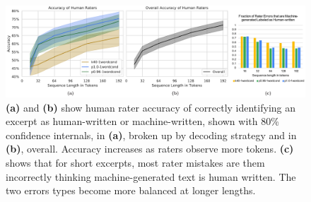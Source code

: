 \begin{figure}[t]
    \centering
    \includegraphics[width=\textwidth]{figures/human_merged}
    \caption{\textbf{(a)} and \textbf{(b)} show human rater accuracy of correctly identifying an excerpt as human-written or machine-written, shown with 80\% confidence internals, in \textbf{(a)}, broken up by decoding strategy and in \textbf{(b)}, overall. Accuracy increases as raters observe more tokens. \textbf{(c)} shows that for short excerpts, most rater mistakes are them incorrectly thinking machine-generated text is human written. The two errors types become more balanced at longer lengths.}
    \label{fig:human_eval} 
\end{figure}

